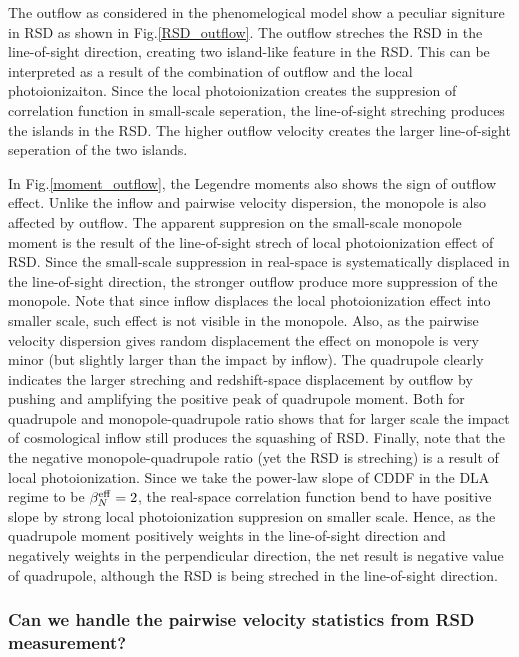 \documentclass[useAMS,usenatbib,twocolumn]{mn2e}
\begin{document}
The outflow as considered in the phenomelogical model show a peculiar signiture
in RSD as shown in Fig.\ref{RSD_outflow}. The outflow streches the RSD in the
line-of-sight direction, creating two island-like feature in the RSD.
This can be interpreted as a result of the combination of outflow and the
local photoionizaiton. Since the local photoionization creates the suppresion
of correlation function in small-scale seperation, the line-of-sight 
streching produces the islands in the RSD. The higher outflow velocity 
creates the larger line-of-sight seperation of the two islands. 

In Fig.\ref{moment_outflow}, the Legendre moments also shows the 
sign of outflow effect. Unlike the inflow and pairwise velocity dispersion,
the monopole is also affected by outflow. The apparent suppresion on
the small-scale monopole moment is the result of the line-of-sight
strech of local photoionization effect of RSD. Since the small-scale 
suppression in real-space is systematically displaced in the line-of-sight
direction, the stronger outflow produce more suppression of the monopole.
Note that since inflow displaces the local photoionization effect into
smaller scale, such effect is not visible in the monopole. Also, as the
pairwise velocity dispersion gives random displacement the effect on
monopole is very minor (but slightly larger than the impact by inflow).
The quadrupole clearly indicates the larger streching and redshift-space
displacement by outflow by pushing and amplifying the positive peak of 
quadrupole moment. Both for quadrupole and monopole-quadrupole ratio shows
that for larger scale the impact of cosmological inflow still produces 
the squashing of RSD. Finally, note that the the negative monopole-quadrupole
ratio (yet the RSD is streching) is a result of local photoionization.
Since we take the power-law slope of CDDF in the DLA regime to be 
$\beta_N^{\rm{eff}}=2$, the real-space correlation function bend to have
positive slope by strong local photoionization suppresion on smaller scale.
Hence, as the quadrupole moment positively weights in the line-of-sight
direction and negatively weights in the perpendicular direction, 
the net result is negative value of quadrupole, although the 
RSD is being streched in the line-of-sight direction.


\subsubsection{Can we handle the pairwise velocity statistics 
from RSD measurement?}
\end{document}
